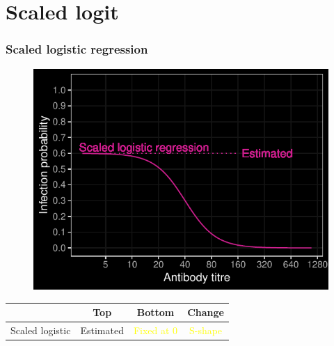 \documentclass{beamer}
\begin{document}
\section{Scaled logit}

\begin{frame}
\frametitle{Scaled logistic regression}

	\begin{figure}
		\includegraphics[scale = 0.75]{../curve-models/curve_7_dark.pdf}%
	\end{figure}

	\pause

	\begin{table}
	\begin{tabular}{l | ccc}
		 & Top & Bottom & Change \\
		\hline
		Scaled logistic & Estimated & \textcolor{yellow}{Fixed at 0} & \textcolor{yellow}{S-shape}
	\end{tabular}
	\end{table}

\end{frame}
\end{document}
